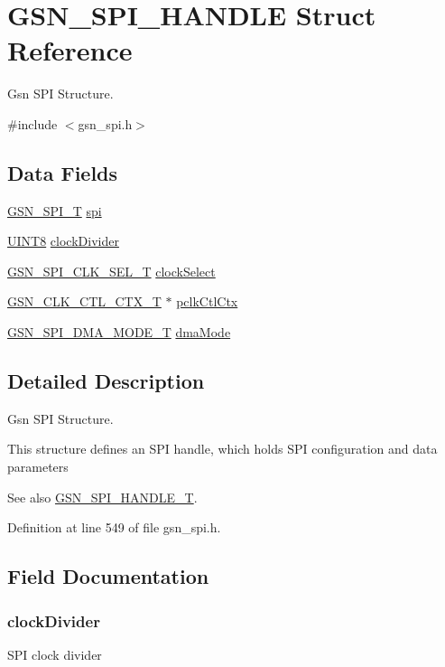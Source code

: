 \hypertarget{a00238}{
\section{GSN\_\-SPI\_\-HANDLE Struct Reference}
\label{a00238}
}


Gsn SPI Structure.  




{\ttfamily \#include $<$gsn\_\-spi.h$>$}

\subsection*{Data Fields}
\begin{DoxyCompactItemize}
\item 
\hyperlink{a00230}{GSN\_\-SPI\_\-T} \hyperlink{a00238_abd539806732464e2493fd896b7539a56}{spi}
\item 
\hyperlink{a00660_gab27e9918b538ce9d8ca692479b375b6a}{UINT8} \hyperlink{a00238_ae7807face22c73f3541066336176a60d}{clockDivider}
\item 
\hyperlink{a00655_gac4a300710a224a1971e5a78eae8eb89e}{GSN\_\-SPI\_\-CLK\_\-SEL\_\-T} \hyperlink{a00238_af879184c3660e99b8402d538c035fbc5}{clockSelect}
\item 
\hyperlink{a00039}{GSN\_\-CLK\_\-CTL\_\-CTX\_\-T} $\ast$ \hyperlink{a00238_a87fd9dda5636bd71a412693b96fed177}{pclkCtlCtx}
\item 
\hyperlink{a00655_gafff743b26bbfafb380a9797457935a0e}{GSN\_\-SPI\_\-DMA\_\-MODE\_\-T} \hyperlink{a00238_a8745e343cad523631d63304871d0bdf3}{dmaMode}
\end{DoxyCompactItemize}


\subsection{Detailed Description}
Gsn SPI Structure. 

This structure defines an SPI handle, which holds SPI configuration and data parameters

\begin{DoxySeeAlso}{See also}
\hyperlink{a00655_ga046c33438e29676344675866f7935308}{GSN\_\-SPI\_\-HANDLE\_\-T}. 
\end{DoxySeeAlso}


Definition at line 549 of file gsn\_\-spi.h.



\subsection{Field Documentation}
\hypertarget{a00238_ae7807face22c73f3541066336176a60d}{
\subsubsection[{clockDivider}]{ {\bf clockDivider}}}
\label{a00238_ae7807face22c73f3541066336176a60d}
SPI clock divider 

